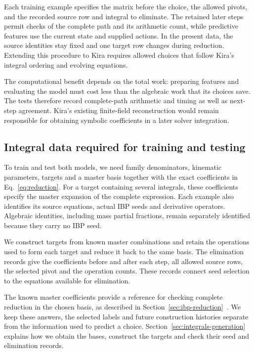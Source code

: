 Each training example specifies the matrix before the choice, the
allowed pivots, and the recorded source row and integral to eliminate.
The retained later steps permit checks of the complete path and its
arithmetic count, while predictive features use the current state
and supplied actions. In the present data, the source identities stay
fixed and one target row changes during reduction. Extending this
procedure to Kira requires allowed choices that follow Kira's
integral ordering and evolving equations.

The computational benefit depends on the total work: preparing
features and evaluating the model must cost less than the algebraic
work that its choices save. The tests therefore record complete-path
arithmetic and timing as well as next-step agreement. Kira's existing
finite-field reconstruction would remain responsible for obtaining
symbolic coefficients in a later solver integration.

\subsection{Integral data required for training and testing}
To train and test both models, we need family denominators, kinematic
parameters, targets and a master basis together with the exact
coefficients in Eq.~\eqref{eq:reduction}. For a target containing
several integrals, these coefficients specify the master expansion
of the complete expression. Each example also identifies its source
equations, actual IBP seeds and derivative operators. Algebraic
identities, including mass partial fractions, remain separately
identified because they carry no IBP seed.

We construct targets from known master combinations and retain the
operations used to form each target and reduce it back to the same
basis. The elimination records give the coefficients before and after
each step, all allowed source rows, the selected pivot and the
operation counts. These records connect seed selection to the
equations available for elimination.

The known master coefficients provide a reference for checking
complete reduction in the chosen basis, as described in
Section~\ref{sec:ibp-reduction}~\cite{Kira3}. We keep these answers,
the selected labels and future construction histories separate from
the information used to predict a choice.
Section~\ref{sec:integrals-generation} explains how we obtain the
bases, construct the targets and check their seed and elimination
records.
